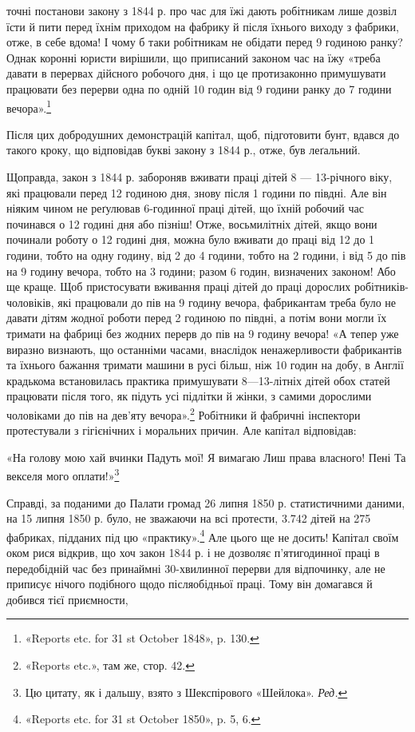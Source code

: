 точні постанови закону з 1844 р. про час для їжі дають робітникам
лише дозвіл їсти й пити перед їхнім приходом на фабрику
й після їхнього виходу з фабрики, отже, в себе вдома! І чому б
таки робітникам не обідати перед 9 годиною ранку? Однак коронні
юристи вирішили, що приписаний законом час на їжу «треба
давати в перервах дійсного робочого дня, і що це протизаконно
примушувати працювати без перерви одна по одній 10 годин
від 9 години ранку до 7 години вечора».\footnote{
«Reports etc. for 31 st October 1848», p. 130.
}

Після цих добродушних демонстрацій капітал, щоб, підготовити
бунт, вдався до такого кроку, що відповідав букві закону
з 1844 р., отже, був леґальний.

Щоправда, закон з 1844 р. забороняв вживати праці дітей 8 —
13-річного віку, які працювали перед 12 годиною дня, знову після
1 години по півдні. Але він ніяким чином не реґулював 6-годинної
праці дітей, що їхній робочий час починався о 12 годині
дня або пізніш! Отже, восьмилітніх дітей, якщо вони починали
роботу о 12 годині дня, можна було вживати до праці від 12 до
1 години, тобто на одну годину, від 2 до 4 години, тобто на 2 години,
і від 5 до пів на 9 годину вечора, тобто на 3 години; разом
6 годин, визначених законом! Або ще краще. Щоб пристосувати
вживання праці дітей до праці дорослих робітників-чоловіків, які
працювали до пів на 9 годину вечора, фабрикантам треба було не
давати дітям жодної роботи перед 2 годиною по півдні, а потім вони
могли їх тримати на фабриці без жодних перерв до пів на 9 годину
вечора! «А тепер уже виразно визнають, що останніми часами,
внаслідок ненажерливости фабрикантів та їхнього бажання тримати
машини в русі більш, ніж 10 годин на добу, в Англії крадькома
встановилась практика примушувати 8—13-літніх дітей
обох статей працювати після того, як підуть усі підлітки й жінки,
з самими дорослими чоловіками до пів на дев’яту вечора».\footnote{
«Reports etc.», там же, стор. 42.
}
Робітники й фабричні інспектори протестували з гігієнічних і
моральних причин. Але капітал відповідав:

«На голову мою хай вчинки
Падуть мої! Я вимагаю
Лиш права власного! Пені
Та векселя мого оплати!»\footnote*{
Цю цитату, як і дальшу, взято з Шекспірового «Шейлока». \emph{Ред.}
}

Справді, за поданими до Палати громад 26 липня 1850 р.
статистичними даними, на 15 липня 1850 р. було, не зважаючи
на всі протести, 3.742 дітей на 275 фабриках, підданих під цю
«практику».\footnote{
«Reports etc. for 31 st October 1850», p. 5, 6.
} Але цього ще не досить! Капітал своїм оком
рися відкрив, що хоч закон 1844 р. і не дозволяє п’ятигодинної
праці в передобідній час без принаймні 30-хвилинної перерви
для відпочинку, але не приписує нічого подібного щодо післяобідньої
праці. Тому він домагався й добився тієї приємности,